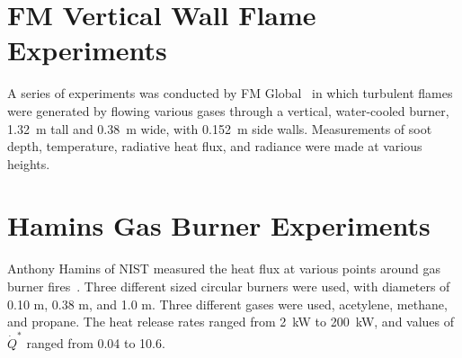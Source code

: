 %
%
%

\section{FM Vertical Wall Flame Experiments}

A series of experiments was conducted by FM Global~\cite{deRis:IAFSS} in which turbulent flames were generated by flowing various gases through a vertical, water-cooled burner, 1.32~m tall and 0.38~m wide, with 0.152~m side walls. Measurements of soot depth, temperature, radiative heat flux, and radiance were made at various heights.


\section{Hamins Gas Burner Experiments}

Anthony Hamins of NIST measured the heat flux at various points around gas burner fires~\cite{Hostikka:3}. Three different sized circular burners were used, with diameters of 0.10 m, 0.38 m, and 1.0 m. Three different gases were used, acetylene, methane, and propane. The heat release rates ranged from 2~kW to 200~kW, and values of $\dot{Q}^*$ ranged from 0.04 to 10.6.


